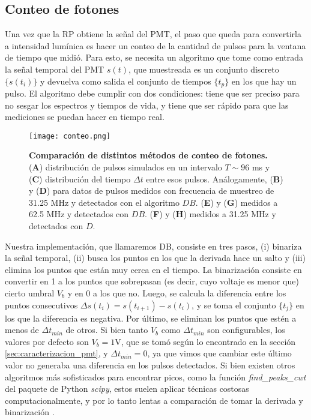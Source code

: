 \subsection{Conteo de fotones} \label{sec:conteo}


Una vez que la RP obtiene la señal del PMT, el paso que queda para convertirla a intensidad lumínica es hacer un conteo de la cantidad de pulsos para la ventana de tiempo que midió.
Para esto, se necesita un algoritmo que tome como entrada la señal temporal del PMT $s(t)$, que muestreada es un conjunto discreto $\{s(t_i)\}$ y devuelva como salida el conjunto de tiempos $\{t_p\}$ en los que hay un pulso.
El algoritmo debe cumplir con dos condiciones: tiene que ser preciso para no sesgar los espectros y tiempos de vida, y tiene que ser rápido para que las mediciones se puedan hacer en tiempo real.

\begin{figure}
    \centering
    \texttt{[image: conteo.png]}
    \caption{\textbf{Comparación de distintos métodos de conteo de fotones.} (\textbf{A}) distribución de pulsos simulados en un intervalo $T \sim 96$ ms y (\textbf{C}) distribución del tiempo $\Delta t$ entre esos pulsos. Análogamente, (\textbf{B}) y (\textbf{D}) para datos de pulsos medidos con frecuencia de muestreo de 31.25 MHz y detectados con el algoritmo $DB$. (\textbf{E}) y (\textbf{G}) medidos a 62.5 MHz y detectados con $DB$. (\textbf{F}) y (\textbf{H}) medidos a 31.25 MHz y detectados con $D$.}
    \label{fig:conteo}
\end{figure}

Nuestra implementación, que llamaremos DB, consiste en tres pasos, (i) binariza la señal temporal, (ii) busca los puntos en los que la derivada hace un salto y (iii) elimina los puntos que están muy cerca en el tiempo.
La binarización consiste en convertir en 1 a los puntos que sobrepasan (es decir, cuyo voltaje es menor que) cierto umbral $V_b$ y en 0 a los que no. 
Luego, se calcula la diferencia entre los puntos consecutivos $\Delta s(t_i) = s(t_{i+1}) - s(t_i)$, y se toma el conjunto $\{t_j\}$ en los que la diferencia es negativa.
Por último, se eliminan los puntos que estén a menos de $\Delta t_{min}$ de otros.
Si bien tanto $V_b$ como $\Delta t_{min}$ son configurables, los valores por defecto son $V_b = 1$V, que se tomó según lo encontrado en la sección \ref{sec:caracterizacion_pmt}, y $\Delta t_{min} = 0$, ya que vimos que cambiar este último valor no generaba una diferencia en los pulsos detectados.
Si bien existen otros algoritmos más sofisticados para encontrar picos, como la función \textit{find\_peaks\_cwt} del paquete de Python \textit{scipy}, estos suelen aplicar técnicas costosas computacionalmente, y por lo tanto lentas a comparación de tomar la derivada y binarización \cite{du_improved_2006}.

